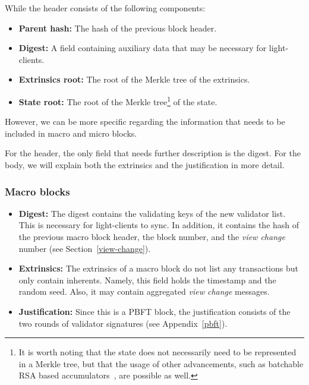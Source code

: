 \documentclass[conference]{IEEEtran}
\begin{document}
While the header consists of the following components:

\begin{itemize}
	\item \textbf{Parent hash:} The hash of the previous block header.
	\item \textbf{Digest:} A field containing auxiliary data that may be necessary for light-clients.
	\item \textbf{Extrinsics root:} The root of the Merkle tree of the extrinsics.
	\item \textbf{State root:} The root of the Merkle tree\footnote{It is worth noting that the state does not necessarily need to be represented in a Merkle tree, but that the usage of other advancements, such as batchable RSA based accumulators~\cite{boneh2018batching}, are possible as well.} of the state.
\end{itemize}

However, we can be more specific regarding the information that needs to be included in macro and micro blocks.

For the header, the only field that needs further description is the digest.
For the body, we will explain both the extrinsics and the justification in more detail.

\subsubsection{Macro blocks}
\begin{itemize}
	\item \textbf{Digest:} The digest contains the validating keys of the new validator list. This is necessary for light-clients to sync. In addition, it contains the hash of the previous macro block header, the block number, and the \textit{view change} number (see Section~\ref{view-change}).
	\item \textbf{Extrinsics:} The extrinsics of a macro block do not list any transactions but only contain inherents. Namely, this field holds the timestamp and the random seed. Also, it may contain aggregated \textit{view change} messages.
	\item \textbf{Justification:} Since this is a PBFT block, the justification consists of the two rounds of validator signatures (see Appendix~\ref{pbft}).
\end{itemize}
\end{document}
